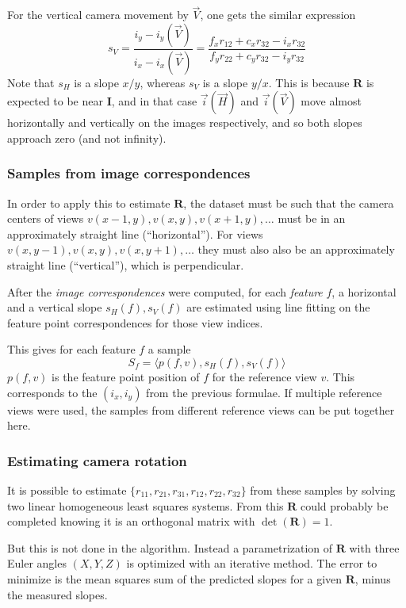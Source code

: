 \documentclass{scrreprt}
\newcommand{\matr}[1]{\mathbf{#1}}
\begin{document}
For the vertical camera movement by $\vec{V}$, one gets the similar expression
\begin{equation}
s_V = \frac{i_y - i_y(\vec{V})}{i_x - i_x(\vec{V})} = \frac{f_x r_{12} + c_x r_{32} - i_x r_{32}}{f_y r_{22} + c_y r_{32} - i_y r_{32}}
\end{equation}
Note that $s_H$ is a slope $x/y$, whereas $s_V$ is a slope $y/x$. This is because $\matr{R}$ is expected to be near $\matr{I}$, and in that case $\vec{i}(\vec{H})$ and $\vec{i}(\vec{V})$ move almost horizontally and vertically on the images respectively, and so both slopes approach zero (and not infinity).


\subsubsection{Samples from image correspondences}
In order to apply this to estimate $\matr{R}$, the dataset must be such that the camera centers of views $v(x-1,y), v(x,y), v(x+1,y), \dots$ must be in an approximately straight line (``horizontal''). For views $v(x,y-1), v(x,y), v(x,y+1), \dots$ they must also also be an approximately straight line (``vertical''), which is perpendicular.

After the \emph{image correspondences} were computed, for each \emph{feature} $f$, a horizontal and a vertical slope $s_H(f), s_V(f)$ are estimated using line fitting on the feature point correspondences for those view indices.

This gives for each feature $f$ a sample
\begin{equation}
S_f = \langle p(f,v), s_H(f), s_V(f) \rangle
\end{equation}
$p(f,v)$ is the feature point position of $f$ for the reference view $v$. This corresponds to the $(i_x, i_y)$ from the previous formulae. If multiple reference views were used, the samples from different reference views can be put together here.


\subsubsection{Estimating camera rotation}
It is possible to estimate $\{r_{11}, r_{21}, r_{31}, r_{12}, r_{22}, r_{32}\}$ from these samples by solving two linear homogeneous least squares systems. From this $\matr{R}$ could probably be completed knowing it is an orthogonal matrix with $\det(\matr{R}) = 1$.

But this is not done in the algorithm. Instead a parametrization of $\matr{R}$ with three Euler angles $(X,Y,Z)$ is optimized with an iterative method. The error to minimize is the mean squares sum of the predicted slopes for a given $\matr{R}$, minus the measured slopes.
\end{document}
